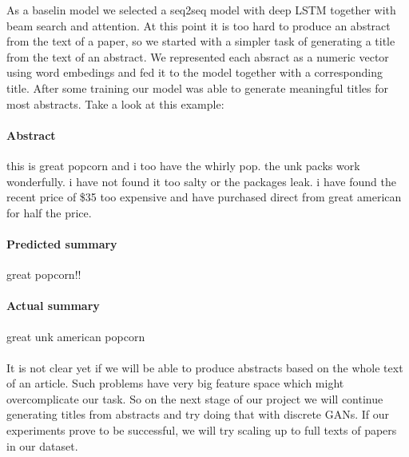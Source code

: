 \documentclass[sigplan]{acmart}
\begin{document}
As a baselin model we selected a seq2seq model with deep LSTM\cite{sutskever-17} together with beam search and attention. At this point it is too hard to produce an abstract from the text of a paper, so we started with a simpler task of generating a title from the text of an abstract. We represented each absract as a numeric vector using word embedings and fed it to the model together with a corresponding title. After some training our model was able to generate meaningful titles for most abstracts. Take a look at this example:

\paragraph{Abstract} this is great popcorn and i too have the whirly pop. the unk packs work wonderfully. i have not found it too salty or the packages leak. i have found the recent price of \$35 too expensive and have purchased direct from great american for half the price.

\paragraph{Predicted summary} great popcorn!!

\paragraph{Actual summary} great unk american popcorn

\paragraph{} It is not clear yet if we will be able to produce abstracts based on the whole text of an article. Such problems have very big feature space which might overcomplicate our task. So on the next stage of our project we will continue generating titles from abstracts and try doing that with discrete GANs. If our experiments prove to be successful, we will try scaling up to full texts of papers in our dataset.


\end{document}
